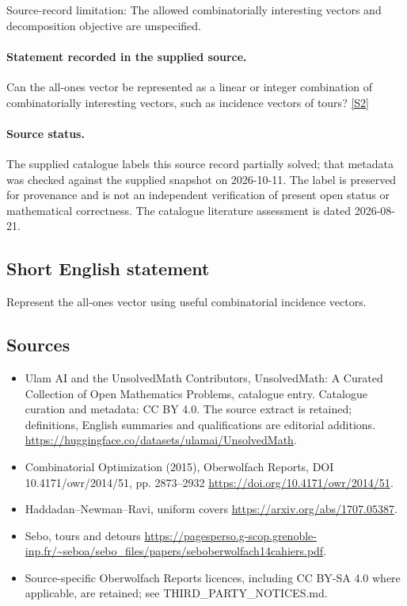 \documentclass[11pt]{article}
\begin{document}
Source-record limitation: The allowed combinatorially interesting vectors and decomposition objective are unspecified.
\paragraph{Statement recorded in the supplied source.}
Can the all-ones vector be represented as a linear or integer combination of combinatorially interesting vectors, such as incidence vectors of tours? \href{https://doi.org/10.4171/owr/2014/51}{[S2]}
\paragraph{Source status.}
The supplied catalogue labels this source record partially solved; that metadata was checked against the supplied snapshot on 2026-10-11. The label is preserved for provenance and is not an independent verification of present open status or mathematical correctness. The catalogue literature assessment is dated 2026-08-21.
\subsection{Short English statement}
Represent the all-ones vector using useful combinatorial incidence vectors.
\subsection{Sources}
\begin{itemize}
\item[S1] Ulam AI and the UnsolvedMath Contributors, UnsolvedMath: A Curated Collection of Open Mathematics Problems, catalogue entry. Catalogue curation and metadata: CC BY 4.0. The source extract is retained; definitions, English summaries and qualifications are editorial additions.
\url{https://huggingface.co/datasets/ulamai/UnsolvedMath}.
\item[S2] Combinatorial Optimization (2015), Oberwolfach Reports, DOI 10.4171/owr/2014/51, pp. 2873--2932
\url{https://doi.org/10.4171/owr/2014/51}.
\item[S3] Haddadan--Newman--Ravi, uniform covers
\url{https://arxiv.org/abs/1707.05387}.
\item[S4] Sebo, tours and detours
\url{https://pagesperso.g-scop.grenoble-inp.fr/~seboa/sebo_files/papers/seboberwolfach14cahiers.pdf}.
\item Source-specific Oberwolfach Reports licences, including CC BY-SA 4.0 where applicable, are retained; see THIRD\_PARTY\_NOTICES.md.
\end{itemize}
\end{document}
